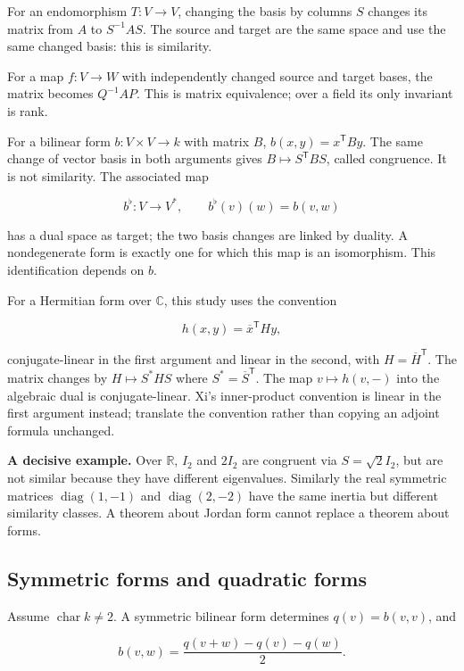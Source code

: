 \documentclass[
  11pt,
]{article}
\begin{document}
For an endomorphism \(T:V\to V\), changing the basis by columns \(S\)
changes its matrix from \(A\) to \(S^{-1}AS\). The source and target are
the same space and use the same changed basis: this is similarity.

For a map \(f:V\to W\) with independently changed source and target
bases, the matrix becomes \(Q^{-1}AP\). This is matrix equivalence; over
a field its only invariant is rank.

For a bilinear form \(b:V\times V\to k\) with matrix \(B\),
\(b(x,y)=x^{\mathsf T}By\). The same change of vector basis in both
arguments gives \(B\mapsto S^{\mathsf T}BS\), called congruence. It is
not similarity. The associated map

\[b^\flat:V\to V^*,\qquad b^\flat(v)(w)=b(v,w)\]

has a dual space as target; the two basis changes are linked by duality.
A nondegenerate form is exactly one for which this map is an
isomorphism. This identification depends on \(b\).

For a Hermitian form over \(\mathbb C\), this study uses the convention

\[h(x,y)=\overline{x}^{\mathsf T}Hy,\]

conjugate-linear in the first argument and linear in the second, with
\(H=\overline H^{\mathsf T}\). The matrix changes by \(H\mapsto S^*HS\)
where \(S^*=\overline S^{\mathsf T}\). The map \(v\mapsto h(v,-)\) into
the algebraic dual is conjugate-linear. Xi's inner-product convention is
linear in the first argument instead; translate the convention rather
than copying an adjoint formula unchanged.

\textbf{A decisive example.} Over \(\mathbb R\), \(I_2\) and \(2I_2\)
are congruent via \(S=\sqrt2 I_2\), but are not similar because they
have different eigenvalues. Similarly the real symmetric matrices
\(\operatorname{diag}(1,-1)\) and \(\operatorname{diag}(2,-2)\) have the
same inertia but different similarity classes. A theorem about Jordan
form cannot replace a theorem about forms.

\subsection{Symmetric forms and quadratic
forms}\label{symmetric-forms-and-quadratic-forms}

Assume \(\operatorname{char}k\ne2\). A symmetric bilinear form
determines \(q(v)=b(v,v)\), and

\[b(v,w)=\frac{q(v+w)-q(v)-q(w)}2.\]
\end{document}
